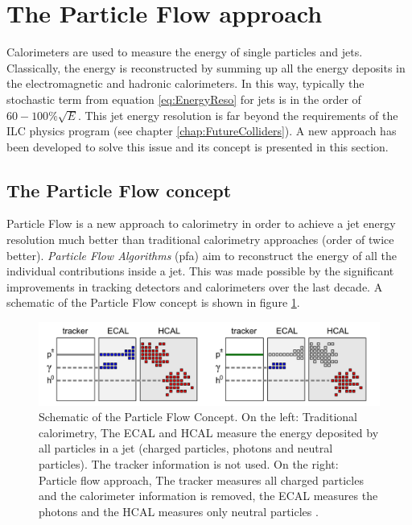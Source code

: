 \section{The Particle Flow approach}
\label{sec:PFA}

Calorimeters are used to measure the energy of single particles and jets. Classically, the energy is reconstructed by summing up all the energy deposits in the electromagnetic and hadronic calorimeters. In this way, typically the stochastic term from equation \ref{eq:EnergyReso} for jets is in the order of $60-100\%\sqrt{E}$. This jet energy resolution is far beyond the requirements of the ILC physics program (see chapter \ref{chap:FutureColliders}). A new approach has been developed to solve this issue and its concept is presented in this section.

\subsection{The Particle Flow concept}

Particle Flow is a new approach to calorimetry in order to achieve a jet energy resolution much better than traditional calorimetry approaches (order of twice better). \textit{Particle Flow Algorithms} (\acrshort{pfa}) aim to reconstruct the energy of all the individual contributions inside a jet. This was made possible by the significant improvements in tracking detectors and calorimeters over the last decade. A schematic of the Particle Flow concept is shown in figure \ref{fig:PFAConcept}.

\begin{figure}[htbp!]
  \centering
  \includegraphics[width=1\linewidth]{chap2/fig/PFAConcept.png}
  \caption{Schematic of the Particle Flow Concept. On the left: Traditional calorimetry, The ECAL and HCAL measure the energy deposited by all particles in a jet (charged particles, photons and neutral particles). The tracker information is not used. On the right: Particle flow approach, The tracker measures all charged particles and the calorimeter information is removed, the ECAL measures the photons and the HCAL measures only neutral particles \cite{Feege:2011dsa}.} \label{fig:PFAConcept}
\end{figure}


